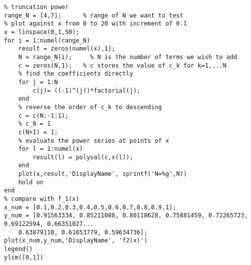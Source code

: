 \lstset{basicstyle=\footnotesize,style=myCustomMatlabStyle}
\begin{lstlisting}
% truncation power
range_N = [4,7];      % range of N we want to test
% plot against x from 0 to 20 with increment of 0.1
x = linspace(0,1,50); 
for i = 1:numel(range_N)
    result = zeros(numel(x),1);
    N = range_N(i);     % N is the number of terms we wish to add
    c = zeros(N,1);   % c stores the value of c_k for k=1,...N
    % find the coefficients directly
    for j = 1:N
        c(j)= ((-1)^(j))*factorial(j);
    end
    % reverse the order of c_k to descending
    c = c(N:-1:1);
    % c_0 = 1
    c(N+1) = 1;
    % evaluate the power series at points of x
    for l = 1:numel(x)
        result(l) = polyval(c,x(l));
    end
    plot(x,result,'DisplayName', sprintf('N=%g',N))
    hold on
end
% compare with f_1(x)
x_num = [0.1,0.2,0.3,0.4,0.5,0.6,0.7,0.8,0.9,1];
y_num = [0.91563334, 0.85211088, 0.80118628, 0.75881459, 0.72265723, 0.69122594, 0.66351027...
    0.63879110, 0.61653779, 0.59634736];
plot(x_num,y_num,'DisplayName', 'f2(x)')
legend()
ylim([0,1])

\end{lstlisting}